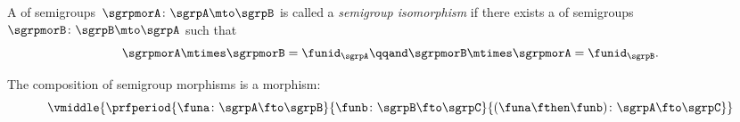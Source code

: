 \begin{ctdefinition}
    \label{def:semigroup-iso}
    A \whomo of semigroups~$\sgrpmorA\colon \sgrpA \mto \sgrpB$ is called a \emph{semigroup isomorphism} if there exists a \whomo of semigroups~$\sgrpmorB\colon \sgrpB \mto \sgrpA$ such that
    \begin{equation}
        \label{eq:sgrp-iso-cond}
        \sgrpmorA \mtimes \sgrpmorB = \funid_\sgrpA  \qqand \sgrpmorB \mtimes \sgrpmorA = \funid_\sgrpB.
    \end{equation}
\end{ctdefinition}

\begin{lemma}
    \label{lem:semigroup-morphisms-compose}
    The composition of semigroup morphisms is a morphism:
    \begin{equation}
        \label{eq:sgrp-mor-compo}
        \vmiddle{
            \prfperiod{
                \funa  \colon \sgrpA \fto \sgrpB
            }{
                \funb \colon  \sgrpB \fto \sgrpC
            }{
                (\funa \fthen \funb)  \colon \sgrpA \fto \sgrpC
            }
        }
    \end{equation}
\end{lemma}

